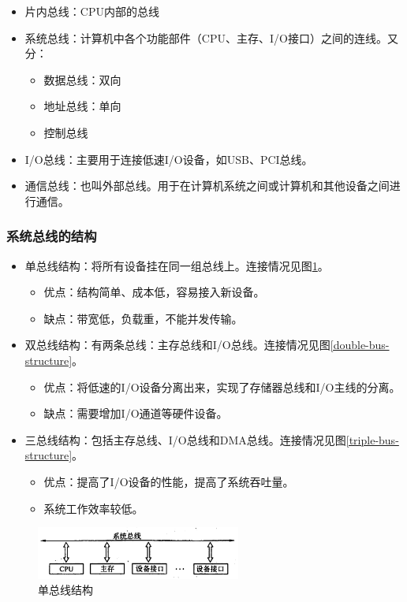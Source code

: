 \documentclass[12pt, a4paper, oneside]{ctexart}
\begin{document}
\begin{itemize}
  \item 片内总线：CPU内部的总线
  \item 系统总线：计算机中各个功能部件（CPU、主存、I/O接口）之间的连线。又分：
  \begin{itemize}
    \item 数据总线：双向
    \item 地址总线：单向
    \item 控制总线
  \end{itemize}
  \item I/O总线：主要用于连接低速I/O设备，如USB、PCI总线。
  \item 通信总线：也叫外部总线。用于在计算机系统之间或计算机和其他设备之间进行通信。
\end{itemize}

\subsubsection{系统总线的结构}

\begin{itemize}
  \item 单总线结构：将所有设备挂在同一组总线上。连接情况见图\ref{single-bus-structure}。
  \begin{itemize}
    \item 优点：结构简单、成本低，容易接入新设备。
    \item 缺点：带宽低，负载重，不能并发传输。
  \end{itemize}
  \item 双总线结构：有两条总线：主存总线和I/O总线。连接情况见图\ref{double-bus-structure}。
  \begin{itemize}
    \item 优点：将低速的I/O设备分离出来，实现了存储器总线和I/O主线的分离。
    \item 缺点：需要增加I/O通道等硬件设备。
  \end{itemize}
  \item 三总线结构：包括主存总线、I/O总线和DMA总线。连接情况见图\ref{triple-bus-structure}。
  \begin{itemize}
    \item 优点：提高了I/O设备的性能，提高了系统吞吐量。
    \item 系统工作效率较低。
  \end{itemize}
\end{itemize}

\begin{figure}
  \centering
  \includegraphics[width=0.6\textwidth]{./images/single-bus-structure.png}
  \caption{单总线结构}
  \label{single-bus-structure}
\end{figure}
\end{document}
